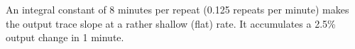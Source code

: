 





An integral constant of 8 minutes per repeat (0.125 repeats per minute) makes the output trace slope at a rather shallow (flat) rate.  It accumulates a 2.5\% output change in 1 minute.




